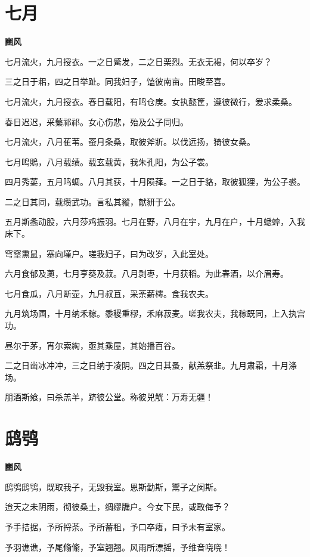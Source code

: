 \documentclass[12pt,a4paper]{ctexbook}
\begin{document}
\section{七月}
\textbf{豳风}\par\vspace{0.5em}
七月流火，九月授衣。一之日觱发，二之日栗烈。无衣无褐，何以卒岁？\par
三之日于耜，四之日举趾。同我妇子，馌彼南亩。田畯至喜。\par
七月流火，九月授衣。春日载阳，有鸣仓庚。女执懿筐，遵彼微行，爰求柔桑。\par
春日迟迟，采蘩祁祁。女心伤悲，殆及公子同归。\par
七月流火，八月萑苇。蚕月条桑，取彼斧斨。以伐远扬，猗彼女桑。\par
七月鸣鵙，八月载绩。载玄载黄，我朱孔阳，为公子裳。\par
四月秀葽，五月鸣蜩。八月其获，十月陨萚。一之日于貉，取彼狐狸，为公子裘。\par
二之日其同，载缵武功。言私其豵，献豜于公。\par
五月斯螽动股，六月莎鸡振羽。七月在野，八月在宇，九月在户，十月蟋蟀，入我床下。\par
穹窒熏鼠，塞向墐户。嗟我妇子，曰为改岁，入此室处。\par
六月食郁及薁，七月亨葵及菽。八月剥枣，十月获稻。为此春酒，以介眉寿。\par
七月食瓜，八月断壶，九月叔苴，采荼薪樗。食我农夫。\par
九月筑场圃，十月纳禾稼。黍稷重穋，禾麻菽麦。嗟我农夫，我稼既同，上入执宫功。\par
昼尔于茅，宵尔索綯，亟其乘屋，其始播百谷。\par
二之日凿冰冲冲，三之日纳于凌阴。四之日其蚤，献羔祭韭。九月肃霜，十月涤场。\par
朋酒斯飨，曰杀羔羊，跻彼公堂。称彼兕觥：万寿无疆！\par

\section{鸱鸮}
\textbf{豳风}\par\vspace{0.5em}
鸱鸮鸱鸮，既取我子，无毁我室。恩斯勤斯，鬻子之闵斯。\par
迨天之未阴雨，彻彼桑土，绸缪牖户。今女下民，或敢侮予？\par
予手拮据，予所捋荼。予所蓄租，予口卒瘏，曰予未有室家。\par
予羽谯谯，予尾翛翛，予室翘翘。风雨所漂摇，予维音哓哓！\par
\end{document}
